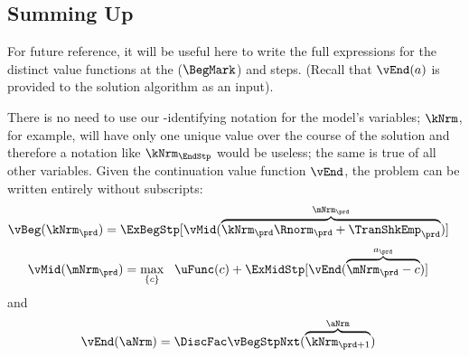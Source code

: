 
\hypertarget{summing-up}{}
\subsection{Summing Up}\label{subsec:summing-up}
For future reference, it will be useful here to write the full expressions for the distinct value functions at the {\Arrival} ($\BegMark$) and {\Decision} steps.  (Recall that $\vEnd(a)$ is provided to the solution algorithm as an input).

There is no need to use our {\move}-identifying notation for the model's variables; $\kNrm$, for example, will have only one unique value over the course of the solution and therefore a notation like $\kNrm_{\EndStp}$ would be useless; the same is true of all other variables.  Given the continuation value function $\vEnd$, the problem can be written entirely without {\interval} subscripts:
  \begin{equation}\begin{gathered}\begin{aligned}
        \vBeg(\kNrm_{\prd}) & = \ExBegStp[\vMid(\overbrace{\kNrm_{\prd} \Rnorm_{\prd} + \TranShkEmp_{\prd}}^{\mNrm_{\prd}})]  \label{eq:vBeg}
      \end{aligned}\end{gathered}\end{equation}
  \begin{equation}\begin{gathered}\begin{aligned}
        \vMid(\mNrm_{\prd}) & = \max_{\{{c}\}}~~\uFunc({c}) +\ExMidStp[ \vEnd(\overbrace{\mNrm_{\prd}-{c}}^{a_{\prd}})] \label{eq:vMid}
      \end{aligned}\end{gathered}\end{equation}
and
  \begin{equation}\begin{gathered}\begin{aligned}
        \vEnd(\aNrm) & = \DiscFac \vBegStpNxt(\overbrace{\kNrm_{\prd+1}}^{\aNrm}) \label{eq:vEndtdefn}
      \end{aligned}\end{gathered}\end{equation}


